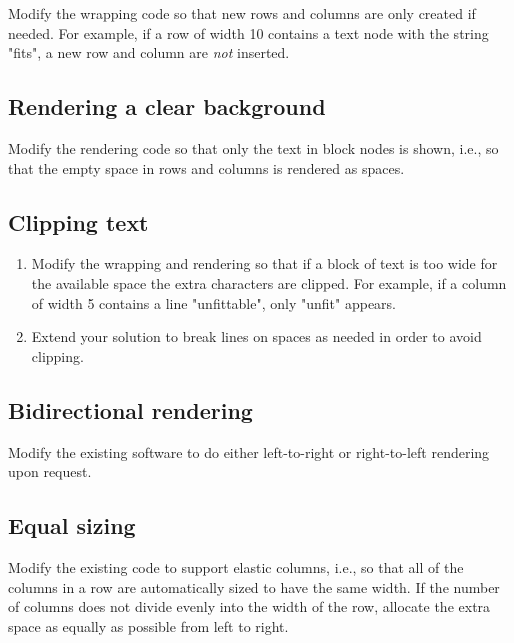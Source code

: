 \documentclass[krantzl]{krantz}
\begin{document}
Modify the wrapping code so that new rows and columns are only created if needed.
For example,
if a row of width 10 contains a text node with the string "fits",
a new row and column are \emph{not} inserted.

\subsection*{Rendering a clear background}


Modify the rendering code so that only the text in block nodes is shown,
i.e.,
so that the empty space in rows and columns is rendered as spaces.

\subsection*{Clipping text}

\begin{enumerate}

\item 

Modify the wrapping and rendering so that
    if a block of text is too wide for the available space
    the extra characters are clipped.
    For example,
    if a column of width 5 contains a line "unfittable",
    only "unfit" appears.



\item 

Extend your solution to break lines on spaces as needed
    in order to avoid clipping.



\end{enumerate}

\subsection*{Bidirectional rendering}


Modify the existing software to do either left-to-right or right-to-left rendering
upon request.

\subsection*{Equal sizing}


Modify the existing code to support elastic columns,
i.e.,
so that all of the columns in a row are automatically sized to have the same width.
If the number of columns does not divide evenly into the width of the row,
allocate the extra space as equally as possible from left to right.
\end{document}
